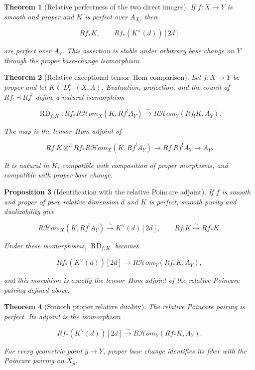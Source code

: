 \documentclass[10pt]{article}
\newtheorem{theorem}{Theorem}[section]
\newtheorem{proposition}[theorem]{Proposition}
\theoremstyle{definition}
\newcommand{\Dctf}{D^b_{\mathrm{ctf}}}
\newcommand{\RHom}{R\mathcal Hom}
\begin{document}
\begin{theorem}[Relative perfectness of the two direct images]
If \(f:X\to Y\) is smooth and proper and \(K\) is perfect over \(A_X\), then

\[
 Rf_*K,\qquad Rf_*(K^\vee(d))[2d]
\]

are perfect over \(A_Y\).  This assertion is stable under arbitrary base
change on \(Y\) through the proper base-change isomorphism.
\end{theorem}

\begin{theorem}[Relative exceptional tensor--Hom comparison]
Let \(f:X\to Y\) be proper and let \(K\in\Dctf(X,A)\).  Evaluation,
projection, and the counit of \(Rf_!\dashv Rf^!\) define a natural
isomorphism

\[
 \operatorname{RD}_{f,K}:
 Rf_*\RHom_X(K,Rf^!A_Y)
 \xrightarrow{\sim}
 \RHom_Y(Rf_!K,A_Y).
\]

The map is the tensor--Hom adjoint of

\[
 Rf_!K\otimes^LRf_*\RHom_X(K,Rf^!A_Y)
 \longrightarrow Rf_!Rf^!A_Y
 \longrightarrow A_Y.
\]

It is natural in \(K\), compatible with composition of proper morphisms, and
compatible with proper base change.
\end{theorem}

\begin{proposition}[Identification with the relative Poincare adjoint]
If \(f\) is smooth and proper of pure relative dimension \(d\) and \(K\) is
perfect, smooth purity and dualizability give

\[
 \RHom_X(K,Rf^!A_Y)
 \xrightarrow{\sim}K^\vee(d)[2d],
 \qquad Rf_!K\xrightarrow{\sim}Rf_*K.
\]

Under these isomorphisms, \(\operatorname{RD}_{f,K}\) becomes

\[
 Rf_*(K^\vee(d))[2d]
 \longrightarrow\RHom_Y(Rf_*K,A_Y),
\]

and this morphism is exactly the tensor--Hom adjoint of the relative
Poincare pairing defined above.
\end{proposition}

\begin{theorem}[Smooth proper relative duality]
The relative Poincare pairing is perfect.  Its adjoint is the isomorphism

\[
 Rf_*(K^\vee(d))[2d]
 \xrightarrow{\sim}
 \RHom_Y(Rf_*K,A_Y).
\]

For every geometric point \(\bar y\to Y\), proper base change identifies its
fiber with the Poincare pairing on \(X_{\bar y}\).
\end{theorem}
\end{document}
